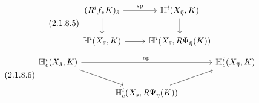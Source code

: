 \begin{equation}\tag{2.1.8.5}
\begin{tikzcd}
(R^i f_* K)_{\bar{s}} \arrow[r, "\mathrm{sp}"] \arrow[d] & \mathbb{H}^i(X_{\bar{\eta}}, K) \arrow[d] \\
\mathbb{H}^i(X_{\bar{s}}, K) \arrow[r] & \mathbb{H}^i(X_{\bar{s}}, R\Psi_{\bar{\eta}}(K))
\end{tikzcd}
\end{equation}
\begin{equation}\tag{2.1.8.6}
\begin{tikzcd}[column sep=large]
\mathbb{H}^i_c(X_{\bar{s}},K) \arrow[rr, "\mathrm{sp}"] \arrow[dr] & & \mathbb{H}^i_c(X_{\bar{\eta}}, K) \\
& \mathbb{H}^i_c(X_{\bar{s}}, R\Psi_{\bar{\eta}}(K)) \arrow[ur] &
\end{tikzcd}
\end{equation}
